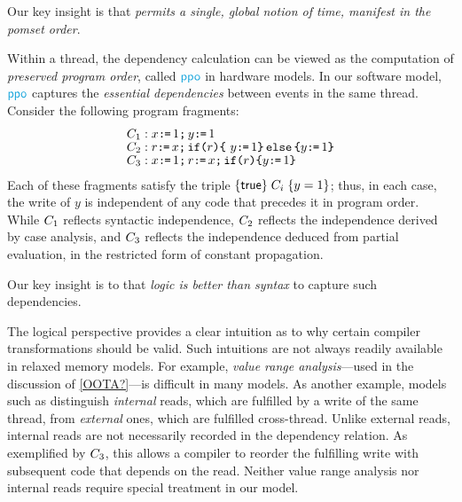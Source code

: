 Our key insight is that \emph{\mca{} permits a single, global notion of time,
  manifest in the pomset order}.
  

Within a thread, the dependency calculation can be viewed as the computation
of \emph{preserved program order}, called $\rppo$ in hardware models.  In our
software model, $\rppo$ captures the \emph{essential dependencies} between
events in the same thread.  Consider the following program fragments:
\begin{align*}
  & C_1: x \texttt{:}\mkern-1mu\texttt{=}\, 1 \texttt{;}\,\allowbreak y \texttt{:}\mkern-1mu\texttt{=}\, 1
  \\[-1ex] & C_2: r \texttt{:}\mkern-1mu\texttt{=}\, x \texttt{;}\,\allowbreak \texttt{if}\allowbreak\texttt{(}r\texttt{)} \allowbreak\texttt{\{}\ y \texttt{:}\mkern-1mu\texttt{=}\, 1 \texttt{\}}\,\allowbreak\texttt{else}\allowbreak\,\texttt{\{} y \texttt{:}\mkern-1mu\texttt{=}\, 1  \texttt{\}}
  \\[-1ex] & C_3: x \texttt{:}\mkern-1mu\texttt{=}\, 1 \texttt{;}\,\allowbreak r \texttt{:}\mkern-1mu\texttt{=}\, x \texttt{;}\,\allowbreak \texttt{if}\allowbreak\texttt{(}r\texttt{)} \allowbreak\texttt{\{} y \texttt{:}\mkern-1mu\texttt{=}\, 1 \texttt{\}}
\end{align*}
Each of these fragments satisfy the \citeauthor{Hoare:1969:ABC:363235.363259} triple $\{\mathsf{true}\}\allowbreak\;C_i\;\allowbreak\{y =1\}$; thus, in each
case, the write of $y$ is independent of any code that precedes it in program
order. While $C_1$ reflects syntactic independence, $C_2$ reflects
the independence derived by case analysis, and $C_3$ reflects the
independence deduced from partial evaluation, in the restricted form of
constant propagation.

Our key insight is to that \emph{logic is better than syntax} to capture such
dependencies.

The logical perspective provides a clear intuition as to why certain compiler
transformations should be valid.  Such intuitions are not always readily
available in relaxed memory models.  For example, \emph{value range
  analysis}---used in the discussion of \eqref{OOTA?}---is difficult in many
models.  As another example, models such as \armeight{} distinguish
\emph{internal} reads, which are fulfilled by a write of the same thread,
from \emph{external} ones, which are fulfilled cross-thread.  Unlike
external reads, internal reads are not necessarily recorded in
the dependency relation.  As exemplified by $C_3$, this allows a compiler
to reorder the fulfilling write with subsequent code that depends on the
read.  Neither value range analysis nor internal reads require special
treatment in our model.




